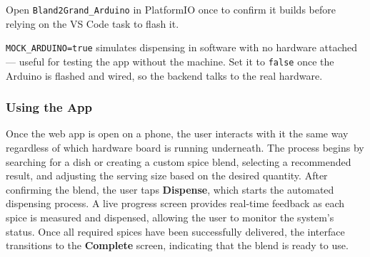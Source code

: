 \documentclass[11pt, letterpaper]{article}
\newcommand{\ticon}[1]{%
  \tikz[baseline=-0.55ex]{\node[circle, draw=white, line width=0.7pt, text=white,
    font=\bfseries\fontsize{6.5}{6.5}\selectfont, inner sep=0pt, minimum size=1.25em] {#1};}%
}
\begin{document}
Open \texttt{Bland2Grand\_Arduino} in PlatformIO once to confirm it builds before relying on the VS Code task to flash it.

\begin{tcolorbox}[warningbox, title={\ticon{!}\ \ Set \texttt{MOCK\_ARDUINO=false} for a real run}]
\small
\texttt{MOCK\_ARDUINO=true} simulates dispensing in software with no hardware attached --- useful for testing the app without the machine. Set it to \texttt{false} once the Arduino is flashed and wired, so the backend talks to the real hardware.
\end{tcolorbox}

\subsubsection{Using the App}

Once the web app is open on a phone, the user interacts with it the same way regardless of which hardware board is running underneath. The process begins by searching for a dish or creating a custom spice blend, selecting a recommended result, and adjusting the serving size based on the desired quantity. After confirming the blend, the user taps \textbf{Dispense}, which starts the automated dispensing process. A live progress screen provides real-time feedback as each spice is measured and dispensed, allowing the user to monitor the system's status. Once all required spices have been successfully delivered, the interface transitions to the \textbf{Complete} screen, indicating that the blend is ready to use.
\end{document}

